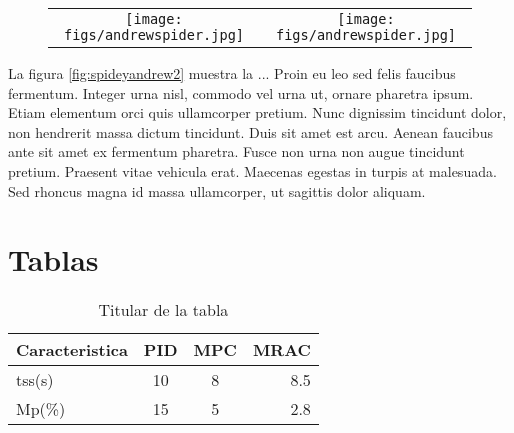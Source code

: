 \documentclass[12pt]{article} %
\begin{document}
\begin{figure}
    \centering
    \begin{tabular}{c c}
        \texttt{[image: figs/andrewspider.jpg]} &  
        \texttt{[image: figs/andrewspider.jpg]} \\
    \end{tabular}
\end{figure}


La figura \ref{fig:spideyandrew2} muestra la ... Proin eu leo sed felis faucibus fermentum. Integer urna nisl, commodo vel urna ut, ornare pharetra ipsum. Etiam elementum orci quis ullamcorper pretium. Nunc dignissim tincidunt dolor, non hendrerit massa dictum tincidunt. Duis sit amet est arcu. Aenean faucibus ante sit amet ex fermentum pharetra. Fusce non urna non augue tincidunt pretium. Praesent vitae vehicula erat. Maecenas egestas in turpis at malesuada. Sed rhoncus magna id massa ullamcorper, ut sagittis dolor aliquam.

\section{Tablas}

\begin{table}[!t] %
    \centering
    \caption{Titular de la tabla} %
    \label{tab:tabla1} %
    \begin{tabular}{| l | c | c | r |}         \hline %
         \textbf{Caracteristica} &  \textbf{PID} & \textbf{MPC} & \textbf{MRAC} \\ \hline 
         tss(s)                  &  10           & 8            &     8.5       \\ \hline
         Mp(\%)                  &  15           & 5            &     2.8       \\ \hline
    \end{tabular}
\end{table}
\end{document}
